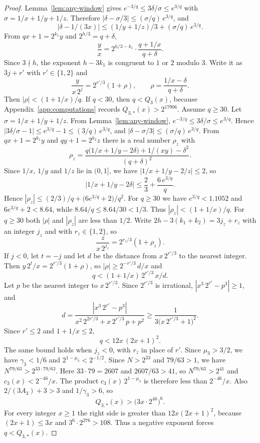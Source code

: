 \documentclass[11pt]{article}
\begin{document}
\begin{proof}
Lemma~\ref{lem:any-window} gives $e^{-3/q} \le 3\delta/\sigma \le e^{3/q}$ with $\sigma = 1/x + 1/y + 1/z$.
Therefore $|\delta - \sigma/3| \le (\sigma/q)\, e^{3/q}$, and
\[
\bigl|\delta - 1/(3x)\bigr| \le (1/y + 1/z)/3 + (\sigma/q)\, e^{3/q}.
\]
From $qx + 1 = 2^{k_1} y$ and $2^{h/3} = q+\delta$,
\[
\frac{y}{x} = 2^{h/3 - k_1} \cdot \frac{q + 1/x}{q+\delta}.
\]
Since $3 \nmid h$, the exponent $h - 3k_1$ is congruent to $1$ or $2$ modulo $3$.
Write it as $3j + r'$ with $r' \in \{1, 2\}$ and
\[
\frac{y}{x\, 2^{j}} = 2^{r'/3}(1+\rho), \qquad \rho = \frac{1/x - \delta}{q+\delta}.
\]
Then $|\rho| < (1+1/x)/q$.
If $q < 30$, then $q < Q_3(x)$, because Appendix~\ref{app:computations} records $Q_{3,*}(x) > 2^{17906}$.
Assume $q \ge 30$.
Let $\sigma = 1/x + 1/y + 1/z$.
From Lemma~\ref{lem:any-window}, $e^{-3/q} \le 3\delta/\sigma \le e^{3/q}$.
Hence $|3\delta/\sigma - 1| \le e^{3/q} - 1 \le (3/q)\, e^{3/q}$, and $|\delta - \sigma/3| \le (\sigma/q)\, e^{3/q}$.
From $qx + 1 = 2^{k_1} y$ and $qy + 1 = 2^{k_2} z$ there is a real number $\rho_z$ with
\[
\rho_z = \frac{q\bigl(1/x + 1/y - 2\delta\bigr) + 1/(xy) - \delta^2}{(q+\delta)^2}.
\]
Since $1/x$, $1/y$ and $1/z$ lie in $(0, 1]$, we have $|1/x + 1/y - 2/z| \le 2$, so
\[
\bigl|1/x + 1/y - 2\delta\bigr| \le \frac23 + \frac{6\, e^{3/q}}{q}.
\]
Hence $|\rho_z| \le (2/3)/q + \bigl(6e^{3/q} + 2\bigr)/q^2$.
For $q \ge 30$ we have $e^{3/q} < 1.1052$ and $6e^{3/q}+2 < 8.64$, while $8.64/q \le 8.64/30 < 1/3$.
Thus $|\rho_z| < (1+1/x)/q$.
For $q \ge 30$ both $|\rho|$ and $|\rho_z|$ are less than $1/2$.
Write $2h - 3(k_1 + k_2) = 3j_z + r_z$ with an integer $j_z$ and with $r_z \in \{1, 2\}$, so
\[
\frac{z}{x\, 2^{j_z}} = 2^{r_z/3}(1+\rho_z).
\]
If $j < 0$, let $t = -j$ and let $d$ be the distance from $x\, 2^{r'/3}$ to the nearest integer.
Then $y\, 2^{t}/x = 2^{r'/3}(1+\rho)$, so $|\rho| \ge 2^{-r'/3}\, d/x$ and
\[
q < (1+1/x)\, 2^{r'/3}\, x/d.
\]
Let $p$ be the nearest integer to $x\, 2^{r'/3}$.
Since $2^{r'/3}$ is irrational, $|x^3\, 2^{r'} - p^3| \ge 1$, and
\[
d = \frac{|x^3\, 2^{r'} - p^3|}{x^2\, 2^{2r'/3} + x\, 2^{r'/3}\, p + p^2} \ge \frac{1}{3\bigl(x\, 2^{r'/3} + 1\bigr)^2}.
\]
Since $r' \le 2$ and $1 + 1/x \le 2$,
\[
q < 12x\, (2x + 1)^2.
\]
The same bound holds when $j_z < 0$, with $r_z$ in place of $r'$.
Since $\mu_3 > 3/2$, we have $\gamma_3 < 1/6$ and $2^{1 - \mu_3} < 2^{-1/2}$.
Since $N > 2^{33}$ and $79/63 > 1$, we have $N^{79/63} > 2^{33 \cdot 79/63}$.
Here $33 \cdot 79 = 2607$ and $2607/63 > 41$, so $N^{79/63} > 2^{41}$ and $c_3(x) < 2^{-46}/x$.
The product $c_3(x)\, 2^{1-\mu_3}$ is therefore less than $2^{-46}/x$.
Also $2/(3A_3) + 3 > 3$ and $1/\gamma_3 > 6$, so
\[
Q_{3,*}(x) > \bigl(3x \cdot 2^{46}\bigr)^{6}.
\]
For every integer $x \ge 1$ the right side is greater than $12x(2x + 1)^2$, because $(2x + 1) \le 3x$ and $3^6 \cdot 2^{276} > 108$.
Thus a negative exponent forces $q < Q_{3,*}(x)$.


\end{proof}
\end{document}
